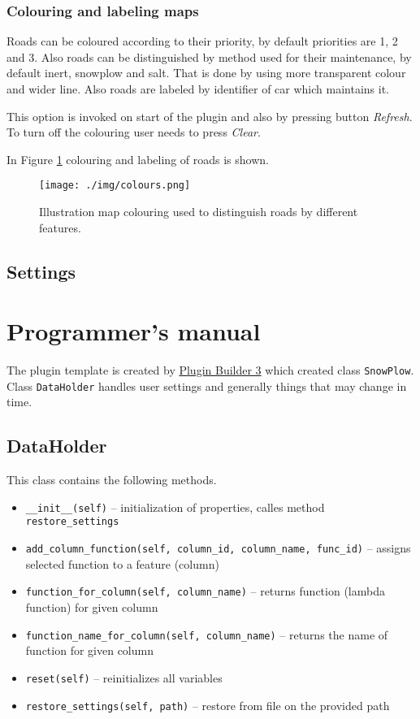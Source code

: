 \documentclass[12pt,a4paper]{article}
\newcommand{\cd}[1]{\texttt{#1}}
\begin{document}
\subsubsection{Colouring and labeling maps}
Roads can be coloured according to their priority, by default priorities are 1, 2 and 3. 
Also roads can be distinguished by method used for their maintenance, by default inert, snowplow and salt. 
That is done by using more transparent colour and wider line.
Also roads are labeled by identifier of car which maintains it.

\par This option is invoked on start of the plugin and also by pressing button \emph{Refresh}.
To turn off the colouring user needs to press \emph{Clear}.

\par In Figure \ref{colours} colouring and labeling of roads is shown.

\begin{figure}[H]\centering
\texttt{[image: ./img/colours.png]}
\caption{Illustration map colouring used to distinguish roads by different features.}
\label{colours}
\end{figure}

\subsection{Settings}

\section{Programmer's manual}
The plugin template is created by \href{http://g-sherman.github.io/Qgis-Plugin-Builder/}{Plugin Builder 3} which created class \cd{SnowPlow}.
Class \cd{DataHolder} handles user settings and generally things that may change in time.

\subsection{DataHolder}
This class contains the following methods.
\begin{itemize}
    \item \cd{\_\_init\_\_(self)} 
        – initialization of properties, calles method \cd{restore\_settings}
    \item \cd{add\_column\_function(self, column\_id, column\_name, func\_id)} 
        – assigns selected function to a feature (column)
    \item \cd{function\_for\_column(self, column\_name)}
        – returns function (lambda function) for given column 
    \item \cd{function\_name\_for\_column(self, column\_name)}
        – returns the name of function for given column
    \item \cd{reset(self)}
        – reinitializes all variables
    \item \cd{restore\_settings(self, path)}
        – restore from file on the provided path
\end{itemize}
\end{document}

